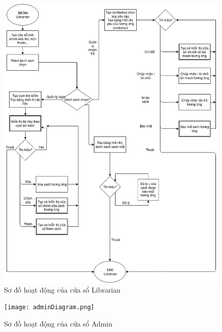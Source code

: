 \documentclass[a4paper]{article}
\begin{document}
	\newpage \newpage 
\begin{figure}[h!]
	\begin{center}
		\includegraphics[scale=.5]{librarianDiagram.png}
		\caption{Sơ đồ hoạt động của cửa sổ Librarian}
	\end{center}
\end{figure}
	\newpage \newpage 
\begin{figure}[h!]
	\begin{center}
		\texttt{[image: adminDiagram.png]}
		\caption{Sơ đồ hoạt động của cửa sổ Admin}
	\end{center}
\end{figure}
	\newpage \newpage 
\end{document}
